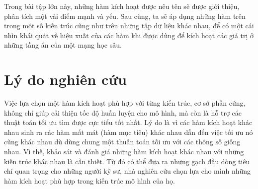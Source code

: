 Trong bài tập lớn này, những hàm kích hoạt được nêu tên sẽ được giới thiệu, phân tích một vài điểm mạnh và yếu.
Sau cùng, ta sẽ áp dụng những hàm trên trong một số kiến trúc cũng như trên những tập dữ liệu khác nhau, để có một cái nhìn khái quát về hiệu xuất của các hàm khi được dùng để kích hoạt các giá trị ở những tầng ẩn của một mạng học sâu.

\section{Lý do nghiên cứu}\label{sec:lydonghiencuu}

Việc lựa chọn một hàm kích hoạt phù hợp với từng kiến trúc, cơ sở phần cứng, không chỉ giúp cải thiện tốc độ huấn luyện cho mô hình, mà còn là hỗ trợ các thuật toán tối ưu tìm được cực tiểu tốt nhất.
Lý do là vì các hàm kích hoạt khác nhau sinh ra các hàm mất mát (hàm mục tiêu) khác nhau dẫn đến việc tối ưu nó cũng khác nhau dù dùng chung một thuấn toán tối ưu với các thông số giống nhau.
Vì thế, khảo sát và đánh giá những hàm kích hoạt khác nhau với những kiến trúc khác nhau là cần thiết.
Từ đó có thể đưa ra những gạch đầu dòng tiêu chí quan trọng cho những người kỹ sư, nhà nghiên cứu chọn lựa cho mình những hàm kích hoạt phù hợp trong kiến trúc mô hình của họ.
